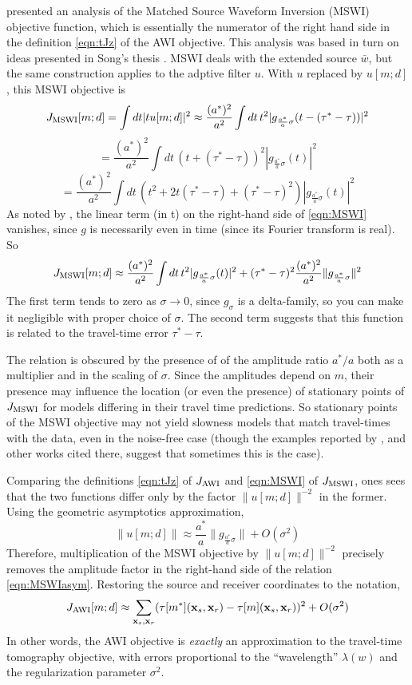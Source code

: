 \cite{HuangSymes2015SEG} presented an analysis of the Matched Source
Waveform Inversion (MSWI) objective function, which is essentially the
numerator of the right hand side in the definition
\ref{eqn:tJz} of the AWI objective. This analysis was based in turn on ideas presented in Song's thesis
\cite[]{Song:94c}. MSWI deals with the extended source $\bar{w}$, but
the same construction applies to the adptive filter $u$. With $u$ replaced by $u[m;d]$,  this MSWI objective is
\[
J_{\rm MSWI}[m;d] = \int dt |tu[m;d]|^2 \approx \frac{(a^*)^2}{a^2} \int dt\, t^2|g_{\frac{a^*}{a}\sigma}(t-(\tau^*-\tau))|^2
\]
\[
=\frac{(a^*)^2}{a^2} \int dt\, (t+(\tau^*-\tau))^2|g_{\frac{a^*}{a}\sigma}(t)|^2
\]
\begin{equation}
  \label{eqn:MSWI}
  =\frac{(a^*)^2}{a^2} \int dt\, (t^2 + 2t
  (\tau^*-\tau)+(\tau^*-\tau)^2)|g_{\frac{a^*}{a}\sigma}(t)|^2
\end{equation}
As noted by \cite{HuangSymes2015SEG}, the linear term (in t) on the
right-hand side of \ref{eqn:MSWI} vanishes,
since $g$ is necessarily even in time (since its Fourier transform is
real). So
\begin{equation}
  \label{eqn:MSWIasym}
  J_{\rm MSWI}[m;d] \approx
\frac{(a^*)^2}{a^2} \int dt\, t^2|g_{\frac{a^*}{a}\sigma}(t)|^2
+(\tau^*-\tau)^2\frac{(a^*)^2}{a^2}\|g_{\frac{a^*}{a}\sigma}\|^2
\end{equation}
The first term tends to zero as $\sigma \rightarrow 0$, since
$g_{\sigma}$ is a delta-family, so you can make it negligible with
proper choice of $\sigma$. The second term suggests that this function
is related to the travel-time error $\tau^*-\tau$.

The relation is obscured by the presence of of the amplitude ratio
$a^*/a$ both as a multiplier and in the scaling of $\sigma$. Since the
amplitudes depend on $m$, their presence may influence the location
(or even the presence) of stationary points of $J_{\rm MSWI}$ for
models differing in their travel time predictions. So stationary
points of the MSWI objective may not yield slowness models that match
travel-times with the data, even in the noise-free case (though
the examples reported by \cite{HuangSymes2015SEG, HuangSymes:Geo17}, and other works
cited there, suggest that sometimes this is the case).

Comparing the definitions \ref{eqn:tJz} of $J_{\rm AWI}$ and
\ref{eqn:MSWI} of $J_{\rm MSWI}$, ones sees
that the two functions differ only by the factor $\|u[m;d]\|^{-2}$ in
the former. Using the geometric asymptotics approximation, 
$$
\|u[m;d]\| \approx \frac{a^*}{a}\|g_{\frac{a^*}{a}\sigma}\| + O(\sigma^2)
$$
Therefore, multiplication of the MSWI objective by $\|u[m;d]\|^{-2}$
precisely removes the amplitude factor in the right-hand side of the
relation \ref{eqn:MSWIasym}. Restoring the source and receiver
coordinates to the notation,
$$
J_{\rm AWI}[m;d] \approx \sum_{{\bf x}_s,{\bf x}_r} (\tau[m^*]({\bf
  x}_s,{\bf x}_r)-\tau[m]({\bf x}_s,{\bf x}_r))^2 + O(\sigma^2)
$$
In other words, the AWI objective is {\em exactly} an approximation to
the travel-time tomography objective, with errors proportional to the
``wavelength'' $\lambda(w)$ and the regularization parameter
$\sigma^2$.

